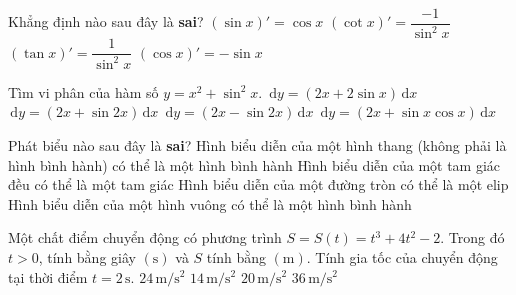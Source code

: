 \begin{ex}%
	Khẳng định nào sau đây là \textbf{sai}?
	\choice
	{$(\sin x)'=\cos x$}
	{$(\cot x)'=\dfrac{-1}{\sin^2x}$}
	{\True $(\tan x)'=\dfrac{1}{\sin^2x}$}
	{$(\cos x)'=-\sin x$}
\end{ex}

\begin{ex}%
	Tìm vi phân của hàm số $y=x^2+\sin^2x$.
	\choice
	{$\mathrm{\,d}y=(2x+2\sin x)\mathrm{\,d}x$}
	{\True $\mathrm{\,d}y=(2x+\sin 2x)\mathrm{\,d}x$}
	{$\mathrm{\,d}y=(2x-\sin 2x)\mathrm{\,d}x$}
	{$\mathrm{\,d}y=(2x+\sin x\cos x)\mathrm{\,d}x$}
\end{ex}

\begin{ex}%
	Phát biểu nào sau đây là \textbf{sai}?
	\choice
	{\True Hình biểu diễn của một hình thang (không phải là hình bình hành) có thể là một hình bình hành}
	{Hình biểu diễn của một tam giác đều có thể là một tam giác}
	{Hình biểu diễn của một đường tròn có thể là một elip}
	{Hình biểu diễn của một hình vuông có thể là một hình bình hành}
\end{ex}

\begin{ex}%
	Một chất điểm chuyển động có phương trình $S=S(t)=t^3+4t^2-2$. Trong đó $t>0$, tính bằng giây $(\mathrm{s})$ và $S$ tính bằng $(\mathrm{m})$. Tính gia tốc của chuyển động tại thời điểm $t=2\mathrm{\,s}$.
	\choice
	{$24\mathrm{\,m}/\mathrm{s}^2$}
	{$14\mathrm{\,m}/\mathrm{s}^2$}
	{\True $20\mathrm{\,m}/\mathrm{s}^2$}
	{$36\mathrm{\,m}/\mathrm{s}^2$} 
\end{ex}




